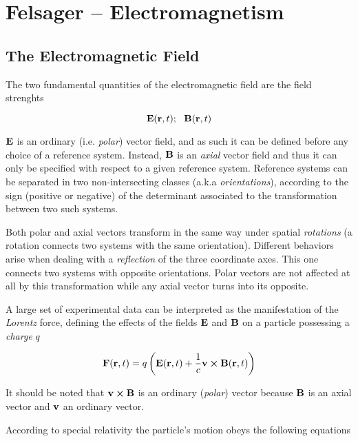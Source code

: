 \chapter{Felsager -- Electromagnetism}
\label{felsager_01} 

\section{The Electromagnetic Field}

The two fundamental quantities of the electromagnetic field are the field strenghts

\begin{equation*}
\vb{E}(\vb{r}, t); \:\:\: \vb{B}(\vb{r}, t)
\end{equation*}

$\vb{E}$ is an ordinary (i.e. \textit{polar}) vector field, and as such it can be defined before any choice of a reference system. Instead, $\vb{B}$ is an \textit{axial} vector field and thus it can only be specified with respect to a given reference system. Reference systems can be separated in two non-intersecting classes (a.k.a \textit{orientations}), according to the sign (positive or negative) of the determinant associated to the transformation between two such systems. 

Both polar and axial vectors transform in the same way under spatial \textit{rotations} (a rotation connects two systems with the same orientation). Different behaviors arise when dealing with a \textit{reflection} of the three coordinate axes. This one connects two systems with opposite orientations. Polar vectors are not affected at all by this transformation while any axial vector turns into its opposite.

A large set of experimental data can be interpreted as the manifestation of the \textit{Lorentz} force, defining the effects of the fields $\vb{E}$ and $\vb{B}$ on a particle possessing a \textit{charge} $q$

\begin{equation}
\vb{F}(\vb{r}, t) = q \left(\vb{E}(\vb{r}, t) + \frac{1}{c} \vb{v} \cross \vb{B}(\vb{r}, t) \right)
\label{eq:Lorentzforce1}
\end{equation}

It should be noted that $\vb{v} \cross \vb{B}$ is an ordinary (\textit{polar}) vector because $\vb{B}$ is an axial vector and $\vb{v}$ an ordinary vector. 

According to special relativity the particle's motion obeys the following equations 

